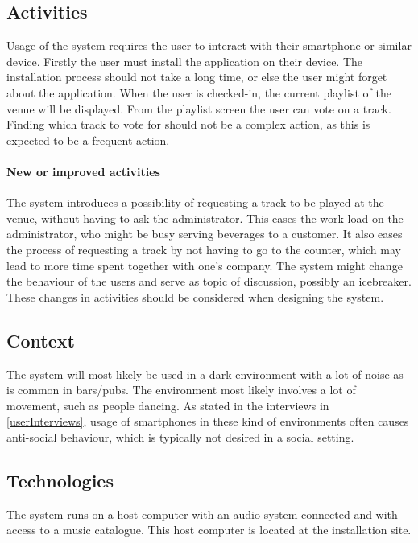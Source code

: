 \subsection{Activities}
\label{sub:pact_activities}
Usage of the system requires the user to interact with their smartphone or similar device. Firstly the user must install the application on their device. The installation process should not take a long time, or else the user might forget about the application. When the user is checked-in, the current playlist of the venue will be displayed. From the playlist screen the user can vote on a track. Finding which track to vote for should not be a complex action, as this is expected to be a frequent action.

\paragraph{New or improved activities}
The system introduces a possibility of requesting a track to be played at the venue, without having to ask the administrator. This eases the work load on the administrator, who might be busy serving beverages to a customer. It also eases the process of requesting a track by not having to go to the counter, which may lead to more time spent together with one's company. The system might change the behaviour of the users and serve as topic of discussion, possibly an icebreaker. These changes in activities should be considered when designing the system.

\subsection{Context}
\label{sub:pact_context}
The system will most likely be used in a dark environment with a lot of noise as is common in bars/pubs. The environment most likely involves a lot of movement, such as people dancing. As stated in the interviews in \cref{userInterviews}, usage of smartphones in these kind of environments often causes anti-social behaviour, which is typically not desired in a social setting.

\subsection{Technologies}
\label{sub:pact_technologies}

The system runs on a host computer with an audio system connected and with access to a music catalogue. This host computer is located at the installation site.

